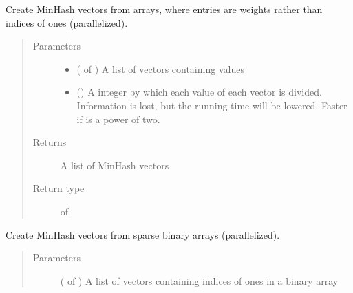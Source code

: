 \documentclass[letterpaper,10pt,english]{sphinxmanual}
\begin{document}
\begin{fulllineitems}
\begin{fulllineitems}
\label{\detokenize{documentation:tmap.Minhash.batch_from_int_weight_array}}
Create MinHash vectors from  arrays, where entries are weights rather than indices of ones (parallelized).
\begin{quote}\begin{description}
\item[{Parameters}] \leavevmode\begin{itemize}
\item {} 
 ( of ) \textendash{} A list of vectors containing  values

\item {} 
 () \textendash{} A integer by which each value of each vector is divided. Information is lost, but the running time will be lowered. Faster if  is a power of two.

\end{itemize}

\item[{Returns}] \leavevmode
A list of MinHash vectors

\item[{Return type}] \leavevmode
{} of 

\end{description}\end{quote}

\end{fulllineitems}


\begin{fulllineitems}
\label{\detokenize{documentation:tmap.Minhash.batch_from_sparse_binary_array}}
Create MinHash vectors from sparse binary arrays (parallelized).
\begin{quote}\begin{description}
\item[{Parameters}] \leavevmode
{} ( of ) \textendash{} A list of vectors containing indices of ones in a binary array


\end{description}
\end{quote}
\end{fulllineitems}
\end{fulllineitems}
\end{document}
